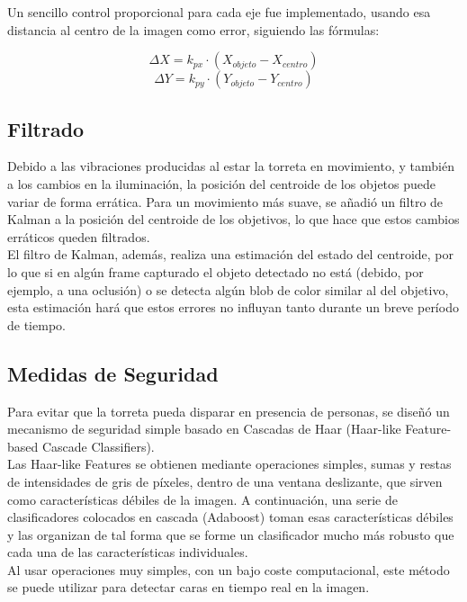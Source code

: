 Un sencillo control proporcional para cada eje fue implementado, usando esa distancia al centro de la imagen como error, siguiendo las fórmulas:

\[\Delta X=k_{px} \cdot (X_{objeto}-X_{centro})\] 
\[\Delta Y=k_{py} \cdot (Y_{objeto}-Y_{centro})\]

\subsection{Filtrado}
Debido a las vibraciones producidas al estar la torreta en movimiento, y también a los cambios en la iluminación, la posición del centroide de los objetos puede variar de forma errática. Para un movimiento más suave, se añadió un filtro de Kalman a la posición del centroide de los objetivos, lo que hace que estos cambios erráticos queden filtrados.\\

El filtro de Kalman, además, realiza una estimación del estado del centroide, por lo que si en algún frame capturado el objeto detectado no está (debido, por ejemplo, a una oclusión) o se detecta algún blob de color similar al del objetivo, esta estimación hará que estos errores no influyan tanto durante un breve período de tiempo.\\

\subsection{Medidas de Seguridad}
Para evitar que la torreta pueda disparar en presencia de personas, se diseñó un mecanismo de seguridad simple basado en Cascadas de Haar (Haar-like Feature-based Cascade Classifiers).\\

Las Haar-like Features se obtienen mediante operaciones simples, sumas y restas de intensidades de gris de píxeles, dentro de una ventana deslizante, que sirven como características débiles de la imagen. 
A continuación, una serie de clasificadores colocados en cascada (Adaboost) toman esas características débiles y las organizan de tal forma que se forme un clasificador mucho más robusto que cada una de las características individuales.\\

Al usar operaciones muy simples, con un bajo coste computacional, este método se puede utilizar para detectar caras en tiempo real en la imagen.\\

\newpage


